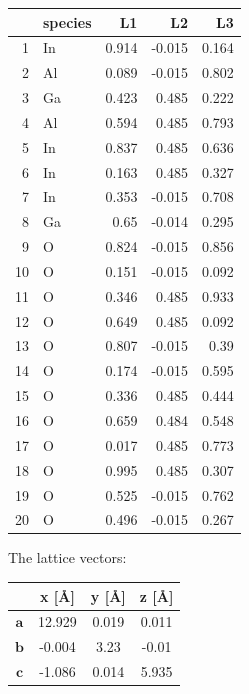 \documentclass[11pt,oneside,czech,american]{book} %
\theoremstyle{plain}
\theoremstyle{definition}
\begin{document}
\begin{table}[h]
	\begin{tabular}{rlrrr}
		\hline
		& species   &    L1 &     L2 &    L3 \\
		\hline
		1 & In        & 0.914 & -0.015 & 0.164 \\
		2 & Al        & 0.089 & -0.015 & 0.802 \\
		3 & Ga        & 0.423 &  0.485 & 0.222 \\
		4 & Al        & 0.594 &  0.485 & 0.793 \\
		5 & In        & 0.837 &  0.485 & 0.636 \\
		6 & In        & 0.163 &  0.485 & 0.327 \\
		7 & In        & 0.353 & -0.015 & 0.708 \\
		8 & Ga        & 0.65  & -0.014 & 0.295 \\
		9 & O         & 0.824 & -0.015 & 0.856 \\
		10 & O         & 0.151 & -0.015 & 0.092 \\
		11 & O         & 0.346 &  0.485 & 0.933 \\
		12 & O         & 0.649 &  0.485 & 0.092 \\
		13 & O         & 0.807 & -0.015 & 0.39  \\
		14 & O         & 0.174 & -0.015 & 0.595 \\
		15 & O         & 0.336 &  0.485 & 0.444 \\
		16 & O         & 0.659 &  0.484 & 0.548 \\
		17 & O         & 0.017 &  0.485 & 0.773 \\
		18 & O         & 0.995 &  0.485 & 0.307 \\
		19 & O         & 0.525 & -0.015 & 0.762 \\
		20 & O         & 0.496 & -0.015 & 0.267 \\
		\hline
	\end{tabular}
\end{table}

The lattice vectors:
\begin{table}[h]
	\centering
	\begin{tabular}{cccc}
		\hline
		& x [\AA]&     y [\AA]&      z [\AA]\\
		\hline
		$\bm{a}$ & 12.929 & 0.019 &  0.011 \\
		$\bm{b}$ & -0.004 & 3.23  & -0.01  \\
		$\bm{c}$ & -1.086 & 0.014 &  5.935 \\
		\hline
	\end{tabular}
\end{table}
\end{document}
